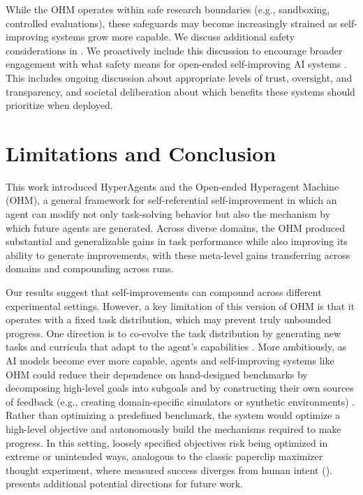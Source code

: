 \documentclass[]{fairmeta}
\begin{document}
While the OHM operates within safe research boundaries (e.g., sandboxing, controlled evaluations), these safeguards may become increasingly strained as self-improving systems grow more capable. We discuss additional safety considerations in . We proactively include this discussion to encourage broader engagement with what safety means for open-ended self-improving AI systems \citep{clune2019ai, sheth2025safety}. This includes ongoing discussion about appropriate levels of trust, oversight, and transparency, and societal deliberation about which benefits these systems should prioritize when deployed.

\section{Limitations and Conclusion}
\label{sec:conclusion}

This work introduced HyperAgents and the Open-ended Hyperagent Machine (OHM), a general framework for self-referential self-improvement in which an agent can modify not only task-solving behavior but also the mechanism by which future agents are generated. Across diverse domains, the OHM produced substantial and generalizable gains in task performance while also improving its ability to generate improvements, with these meta-level gains transferring across domains and compounding across runs.

Our results suggest that self-improvements can compound across different experimental settings. However, a key limitation of this version of OHM is that it operates with a fixed task distribution, which may prevent truly unbounded progress. One direction is to co-evolve the task distribution by generating new tasks and curricula that adapt to the agent's capabilities \citep{faldoromni, bolton2025sima}. More ambitiously, as AI models become ever more capable, agents and self-improving systems like OHM could reduce their dependence on hand-designed benchmarks by decomposing high-level goals into subgoals \citep{meyerson2025solving} and by constructing their own sources of feedback (e.g., creating domain-specific simulators or synthetic environments) \citep{sundaram2026teaching}. Rather than optimizing a predefined benchmark, the system would optimize a high-level objective and autonomously build the mechanisms required to make progress. In this setting, loosely specified objectives risk being optimized in extreme or unintended ways, analogous to the classic paperclip maximizer thought experiment, where measured success diverges from human intent \citep{nick2014superintelligence} (). 
 presents additional potential directions for future work.
\end{document}
